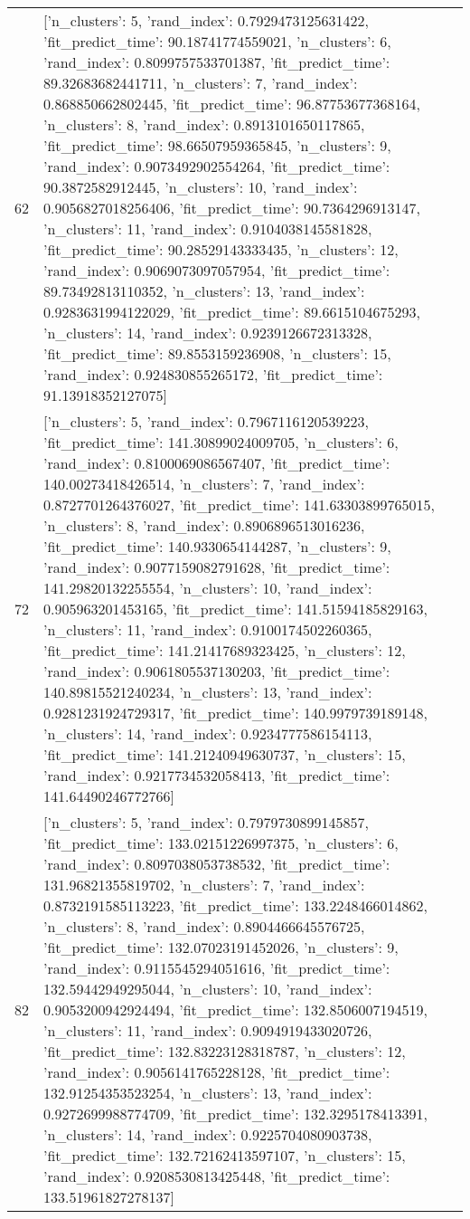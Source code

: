 \begin{tabular}{rl}
62 & [{'n_clusters': 5, 'rand_index': 0.7929473125631422, 'fit_predict_time': 90.18741774559021}, {'n_clusters': 6, 'rand_index': 0.8099757533701387, 'fit_predict_time': 89.32683682441711}, {'n_clusters': 7, 'rand_index': 0.868850662802445, 'fit_predict_time': 96.87753677368164}, {'n_clusters': 8, 'rand_index': 0.8913101650117865, 'fit_predict_time': 98.66507959365845}, {'n_clusters': 9, 'rand_index': 0.9073492902554264, 'fit_predict_time': 90.3872582912445}, {'n_clusters': 10, 'rand_index': 0.9056827018256406, 'fit_predict_time': 90.7364296913147}, {'n_clusters': 11, 'rand_index': 0.9104038145581828, 'fit_predict_time': 90.28529143333435}, {'n_clusters': 12, 'rand_index': 0.9069073097057954, 'fit_predict_time': 89.73492813110352}, {'n_clusters': 13, 'rand_index': 0.9283631994122029, 'fit_predict_time': 89.6615104675293}, {'n_clusters': 14, 'rand_index': 0.9239126672313328, 'fit_predict_time': 89.8553159236908}, {'n_clusters': 15, 'rand_index': 0.924830855265172, 'fit_predict_time': 91.13918352127075}] \\
72 & [{'n_clusters': 5, 'rand_index': 0.7967116120539223, 'fit_predict_time': 141.30899024009705}, {'n_clusters': 6, 'rand_index': 0.8100069086567407, 'fit_predict_time': 140.00273418426514}, {'n_clusters': 7, 'rand_index': 0.8727701264376027, 'fit_predict_time': 141.63303899765015}, {'n_clusters': 8, 'rand_index': 0.8906896513016236, 'fit_predict_time': 140.9330654144287}, {'n_clusters': 9, 'rand_index': 0.9077159082791628, 'fit_predict_time': 141.29820132255554}, {'n_clusters': 10, 'rand_index': 0.905963201453165, 'fit_predict_time': 141.51594185829163}, {'n_clusters': 11, 'rand_index': 0.9100174502260365, 'fit_predict_time': 141.21417689323425}, {'n_clusters': 12, 'rand_index': 0.9061805537130203, 'fit_predict_time': 140.89815521240234}, {'n_clusters': 13, 'rand_index': 0.9281231924729317, 'fit_predict_time': 140.9979739189148}, {'n_clusters': 14, 'rand_index': 0.9234777586154113, 'fit_predict_time': 141.21240949630737}, {'n_clusters': 15, 'rand_index': 0.9217734532058413, 'fit_predict_time': 141.64490246772766}] \\
82 & [{'n_clusters': 5, 'rand_index': 0.7979730899145857, 'fit_predict_time': 133.02151226997375}, {'n_clusters': 6, 'rand_index': 0.8097038053738532, 'fit_predict_time': 131.96821355819702}, {'n_clusters': 7, 'rand_index': 0.8732191585113223, 'fit_predict_time': 133.2248466014862}, {'n_clusters': 8, 'rand_index': 0.8904466645576725, 'fit_predict_time': 132.07023191452026}, {'n_clusters': 9, 'rand_index': 0.9115545294051616, 'fit_predict_time': 132.59442949295044}, {'n_clusters': 10, 'rand_index': 0.9053200942924494, 'fit_predict_time': 132.8506007194519}, {'n_clusters': 11, 'rand_index': 0.9094919433020726, 'fit_predict_time': 132.83223128318787}, {'n_clusters': 12, 'rand_index': 0.9056141765228128, 'fit_predict_time': 132.91254353523254}, {'n_clusters': 13, 'rand_index': 0.9272699988774709, 'fit_predict_time': 132.3295178413391}, {'n_clusters': 14, 'rand_index': 0.9225704080903738, 'fit_predict_time': 132.72162413597107}, {'n_clusters': 15, 'rand_index': 0.9208530813425448, 'fit_predict_time': 133.51961827278137}] \\

\end{tabular}

